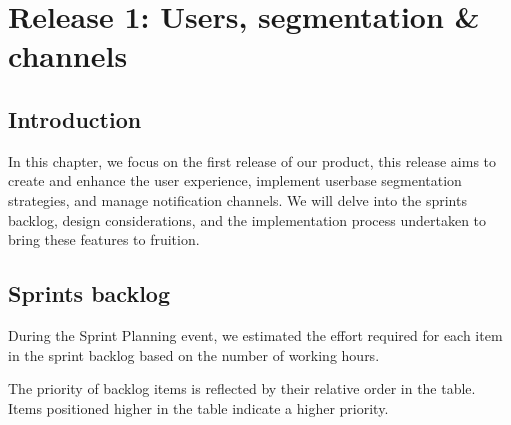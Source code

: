 \chapter{Release 1: Users, segmentation \& channels}

\section*{Introduction}
In this chapter, we focus on the first release of our product, this release aims to create and enhance
the user experience, implement userbase segmentation strategies, and manage notification channels.
We will delve into the sprints backlog, design considerations, and the implementation process
undertaken to bring these features to fruition.


\section{Sprints backlog}
During the Sprint Planning event, we estimated the effort required for each item in the sprint backlog
based on the number of working hours.

The priority of backlog items is reflected by their relative order in the table. Items positioned
higher in the table indicate a higher priority. \\

